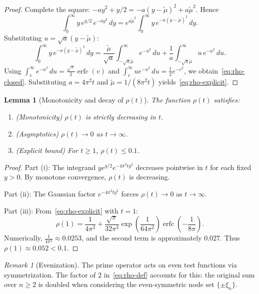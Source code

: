 \documentclass[11pt,a4paper]{article}
\newtheorem{lemma}[theorem]{Lemma}
\theoremstyle{definition}
\theoremstyle{remark}
\newtheorem{remark}[theorem]{Remark}
\DeclareMathOperator{\erfc}{erfc}
\begin{document}
\begin{proof}
Complete the square: $-a y^2 + y/2 = -a(y - \tilde{\mu})^2 + a\tilde{\mu}^2$. Hence
\[
  \int_0^{\infty} y \, e^{y/2} \, e^{-a y^2}\, dy
  = e^{a\tilde{\mu}^2} \int_0^{\infty} y \, e^{-a(y - \tilde{\mu})^2}\, dy.
\]
Substituting $u = \sqrt{a}(y - \tilde{\mu})$:
\[
  \int_0^{\infty} y \, e^{-a(y - \tilde{\mu})^2}\, dy
  = \frac{\tilde{\mu}}{\sqrt{a}} \int_{-\sqrt{a}\tilde{\mu}}^{\infty} e^{-u^2}\, du
    + \frac{1}{a} \int_{-\sqrt{a}\tilde{\mu}}^{\infty} u \, e^{-u^2}\, du.
\]
Using $\int_v^{\infty} e^{-u^2}\, du = \frac{\sqrt{\pi}}{2} \erfc(v)$ and $\int_v^{\infty} u e^{-u^2}\, du = \frac{1}{2} e^{-v^2}$, we obtain~\eqref{eq:rho-closed}. Substituting $a = 4\pi^2 t$ and $\tilde{\mu} = 1/(8\pi^2 t)$ yields~\eqref{eq:rho-explicit}.
\end{proof}

\begin{lemma}[Monotonicity and decay of $\rho(t)$]\label{lem:rho-monotone}
The function $\rho(t)$ satisfies:
\begin{enumerate}[label=(\roman*)]
\item (Monotonicity) $\rho(t)$ is strictly decreasing in $t$.
\item (Asymptotics) $\rho(t) \to 0$ as $t \to \infty$.
\item (Explicit bound) For $t \geq 1$, $\rho(t) \leq 0.1$.
\end{enumerate}
\end{lemma}

\begin{proof}
Part (i): The integrand $y e^{y/2} e^{-4\pi^2 t y^2}$ decreases pointwise in $t$ for each fixed $y > 0$. By monotone convergence, $\rho(t)$ is decreasing.

Part (ii): The Gaussian factor $e^{-4\pi^2 t y^2}$ forces $\rho(t) \to 0$ as $t \to \infty$.

Part (iii): From~\eqref{eq:rho-explicit} with $t = 1$:
\[
  \rho(1) = \frac{1}{4\pi^2} + \frac{\sqrt{\pi}}{32\pi^3} \exp\left( \frac{1}{64\pi^2} \right) \erfc\left( -\frac{1}{8\pi} \right).
\]
Numerically, $\frac{1}{4\pi^2} \approx 0.0253$, and the second term is approximately $0.027$. Thus $\rho(1) \approx 0.052 < 0.1$.
\end{proof}

\begin{remark}[Evenization]\label{rem:evenization}
The prime operator acts on even test functions via symmetrization. The factor of $2$ in~\eqref{eq:rho-def} accounts for this: the original sum over $n \geq 2$ is doubled when considering the even-symmetric node set $\{\pm \xi_n\}$.
\end{remark}
\end{document}
